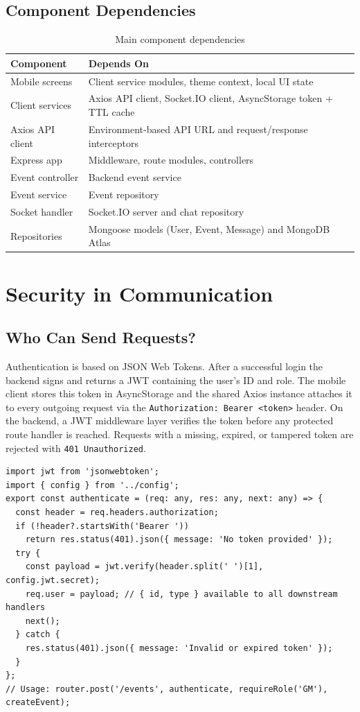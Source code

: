 \documentclass[12pt,a4paper]{article}
\begin{document}
\subsection{Component Dependencies}
\begin{table}[H]
\centering
\caption{Main component dependencies}
\begin{tabularx}{\textwidth}{@{}l X@{}}
\toprule
\textbf{Component} & \textbf{Depends On} \\
\midrule
Mobile screens & Client service modules, theme context, local UI state \\
Client services & Axios API client, Socket.IO client, AsyncStorage token + TTL cache \\
Axios API client & Environment-based API URL and request/response interceptors \\
Express app & Middleware, route modules, controllers \\
Event controller & Backend event service \\
Event service & Event repository \\
Socket handler & Socket.IO server and chat repository \\
Repositories & Mongoose models (User, Event, Message) and MongoDB Atlas \\
\bottomrule
\end{tabularx}
\end{table}
\section{Security in Communication}
\subsection{Who Can Send Requests?}
Authentication is based on JSON Web Tokens. After a successful login the backend signs
and returns a JWT containing the user's ID and role. The mobile client stores this token
in AsyncStorage and the shared Axios instance attaches it to every outgoing request via
the \texttt{Authorization: Bearer <token>} header. On the backend, a JWT middleware
layer verifies the token before any protected route handler is reached. Requests with a
missing, expired, or tampered token are rejected with \texttt{401 Unauthorized}.
\begin{lstlisting}[caption={authMiddleware.ts -- JWT verification before protected routes}]
import jwt from 'jsonwebtoken';
import { config } from '../config';
export const authenticate = (req: any, res: any, next: any) => {
  const header = req.headers.authorization;
  if (!header?.startsWith('Bearer '))
    return res.status(401).json({ message: 'No token provided' });
  try {
    const payload = jwt.verify(header.split(' ')[1], config.jwt.secret);
    req.user = payload; // { id, type } available to all downstream handlers
    next();
  } catch {
    res.status(401).json({ message: 'Invalid or expired token' });
  }
};
// Usage: router.post('/events', authenticate, requireRole('GM'), createEvent);
\end{lstlisting}
\end{document}
